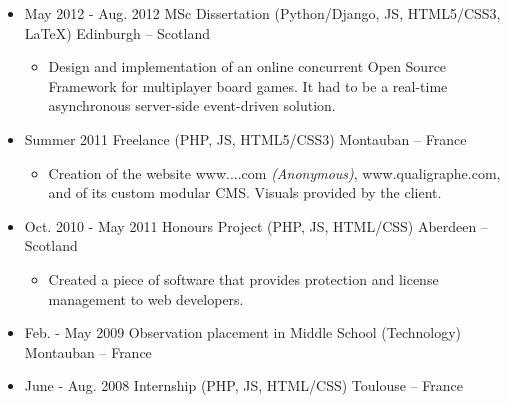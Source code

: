 \documentclass{res}
\begin{document}
\begin{resume}
\begin{itemize}
                \item[] May 2012 - Aug. 2012 \tabto{5cm} MSc Dissertation (Python/Django, JS, HTML5/CSS3, \LaTeX{}) \hfill Edinburgh -- Scotland
                \begin{itemize}
                        \item[] Design and implementation of an online concurrent Open Source Framework for multiplayer board games. It had to be a real-time asynchronous server-side event-driven solution. 
                \end{itemize}
                \item[] Summer 2011 \tabto{5cm} Freelance (PHP, JS, HTML5/CSS3) \hfill Montauban -- France
                \begin{itemize}
                        \item[] Creation of the website \ifisanon www....com \textit{(Anonymous)}, \else www.qualigraphe.com, \fi and of its custom modular CMS. Visuals provided by the client. 
                \end{itemize}
                \item[] Oct. 2010 - May 2011 \tabto{5cm} Honours Project (PHP, JS, HTML/CSS) \hfill Aberdeen -- Scotland
                \begin{itemize}
                        \item[] Created a piece of software that provides protection and license management to web developers.
                \end{itemize}
                \item[] Feb. - May 2009 \tabto{5cm} Observation placement in Middle School (Technology) \hfill Montauban -- France
                \item[] June - Aug. 2008 \tabto{5cm} Internship (PHP, JS, HTML/CSS) \hfill Toulouse -- France

\end{itemize}
\end{resume}
\end{document}
